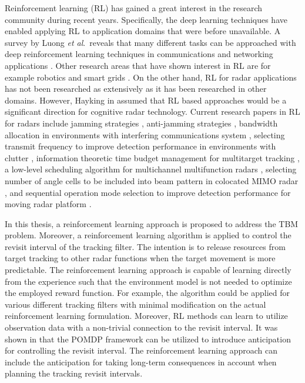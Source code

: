 \documentclass[11pt,a4paper]{article}
\newcommand{\etal}{\textit{et al}.~}
\begin{document}
Reinforcement learning (RL) has gained a great interest in the research community during recent years.
Specifically, the deep learning techniques have enabled applying RL to application domains that were before unavailable.
A survey by Luong \etal reveals that many different tasks can be approached with deep reinforcement learning techniques in communications and networking applications \cite{Luong2018}.
Other research areas that have shown interest in RL are for example robotics \cite{Kober2013} and smart grids \cite{Zhang2018}.
On the other hand, 
RL for radar applications has not been researched as extensively as it has been researched in other domains.
However, Hayking in \cite{Haykin2006} assumed that RL based approaches would be a significant direction for cognitive radar technology.
Current research papers in RL for radars include 
jamming strategies \cite{Qiang2017, Wang2019, Wang2019a, Zhang2019},
anti-jamming strategies \cite{Kang2018, Ak2019}, 
bandwidth allocation in environments with interfering communications system \cite{Selvi2018, Kozy2019},
selecting transmit frequency to improve detection performance in environments with clutter \cite{Wabeke2010}, 
information theoretic time budget management for multitarget tracking \cite{Kreucher2005, Xu2010},
a low-level scheduling algorithm for multichannel multifunction radars \cite{Shaghaghi2018},
selecting number of angle cells to be included into beam pattern in colocated MIMO radar \cite{Wang2018}, 
and sequential operation mode selection to improve detection performance for moving radar platform \cite{Smits2008}.

In this thesis, a reinforcement learning approach is proposed to address the TBM problem.
Moreover, a reinforcement learning algorithm is applied to control the revisit interval of the tracking filter.
The intention is to release resources from target tracking to other radar functions when the target movement is more predictable.
The reinforcement learning approach is capable of learning directly from the experience such that the environment model is not needed to optimize the employed reward function.
For example, the algorithm could be applied for various different tracking filters with minimal modification on the actual reinforcement learning formulation.  
Moreover, RL methods can learn to utilize observation data with a non-trivial connection to the revisit interval.
It was shown in \cite{Charlish2015} that the POMDP framework can be utilized to introduce anticipation for controlling the revisit interval.
The reinforcement learning approach can include the anticipation for taking long-term consequences in account when planning the 
tracking revisit intervals.
\end{document}
